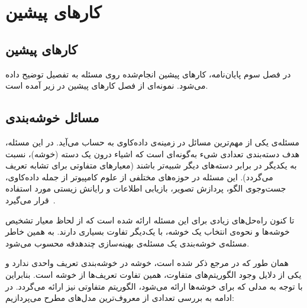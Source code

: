 \chapter{کارهای پیشین}
\section{کارهای پیشین}

در فصل سوم پایان‌نامه، کارهای پیشین انجام‌شده روی مسئله به تفصیل توضیح داده می‌شود.
نمونه‌ای از فصل کارهای پیشین در زیر آمده است.


\section{مسائل خوشه‌بندی}

مسئله‌ی  یکی از مهم‌ترین مسائل در زمینه‌ی داده‌کاوی به حساب می‌آید.
در این مسئله، هدف دسته‌بندی تعدادی شیء به‌گونه‌ای است که اشیاء درون یک دسته (خوشه)، نسبت به یکدیگر در برابر دسته‌های دیگر شبیه‌تر باشند (معیارهای متفاوتی برای تشابه تعریف می‌گردد).
این مسئله در حوزه‌های مختلفی از علوم کامپیوتر از جمله داده‌کاوی، جست‌وجوی الگو، پردازش تصویر، بازیابی اطلاعات و رایانش زیستی مورد استفاده قرار می‌گیرد~\cite{han2006}.

تا کنون راه‌حل‌های زیادی برای این مسئله ارائه شده است که از لحاظ معیار تشخیص خوشه‌ها و نحوه‌ی انتخاب یک خوشه، با یک‌دیگر تفاوت بسیاری دارند.
به همین خاطر مسئله‌ی خوشه‌بندی یک مسئله‌ی بهینه‌سازی چندهدفه محسوب می‌شود.


همان طور که در مرجع \cite{estivill2002so} ذکر شده است، خوشه در خوشه‌بندی تعریف واحدی ندارد و یکی از دلایل وجود الگوریتم‌های متفاوت، همین تفاوت تعریف‌ها از خوشه است.
بنابراین با توجه به مدلی که برای خوشه‌ها ارائه می‌شود، الگوریتم متفاوتی نیز ارائه می‌گردد.
در ادامه به بررسی تعدادی از معروف‌ترین مدل‌های مطرح می‌پردازیم:

